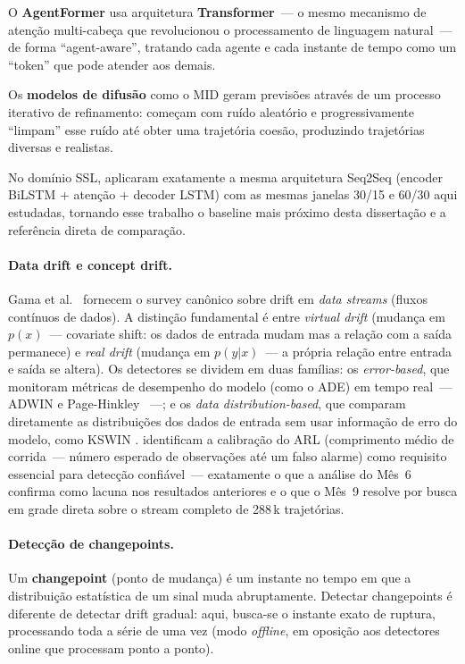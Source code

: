 \documentclass[11pt,a4paper]{article}
\begin{document}
O \textbf{AgentFormer} \cite{yuan2021} usa arquitetura \textbf{Transformer}~--- o mesmo mecanismo de aten\c{c}\~ao multi-cabe\c{c}a que revolucionou o processamento de linguagem natural~--- de forma ``agent-aware'', tratando cada agente e cada instante de tempo como um ``token'' que pode atender aos demais.

Os \textbf{modelos de difus\~ao} como o MID \cite{gu2022} geram previs\~oes atrav\'es de um processo iterativo de refinamento: come\c{c}am com ru\'ido aleat\'orio e progressivamente ``limpam'' esse ru\'ido at\'e obter uma trajet\'oria coes\~ao, produzindo trajet\'orias diversas e realistas.

No dom\'inio SSL, \citet{steuernagel2022} aplicaram exatamente a mesma arquitetura Seq2Seq (encoder BiLSTM + aten\c{c}\~ao + decoder LSTM) com as mesmas janelas 30/15 e 60/30 aqui estudadas, tornando esse trabalho o baseline mais pr\'oximo desta disserta\c{c}\~ao e a refer\^encia direta de compara\c{c}\~ao.

\paragraph{Data drift e concept drift.}
Gama et al.\ \cite{gama2014} fornecem o survey can\^onico sobre drift em \emph{data streams} (fluxos cont\'inuos de dados). A distin\c{c}\~ao fundamental \'e entre \emph{virtual drift} (mudan\c{c}a em $p(x)$~--- covariate shift: os dados de entrada mudam mas a rela\c{c}\~ao com a sa\'ida permanece) e \emph{real drift} (mudan\c{c}a em $p(y|x)$~--- a pr\'opria rela\c{c}\~ao entre entrada e sa\'ida se altera). Os detectores se dividem em duas fam\'ilias: os \emph{error-based}, que monitoram m\'etricas de desempenho do modelo (como o ADE) em tempo real~--- ADWIN \cite{adwin} e Page-Hinkley \cite{page_hinkley}~---; e os \emph{data distribution-based}, que comparam diretamente as distribui\c{c}\~oes dos dados de entrada sem usar informa\c{c}\~ao de erro do modelo, como KSWIN \cite{kswin}. \citet{lu2019} identificam a calibra\c{c}\~ao do ARL (comprimento m\'edio de corrida~--- n\'umero esperado de observa\c{c}\~oes at\'e um falso alarme) como requisito essencial para detec\c{c}\~ao confi\'avel~--- exatamente o que a an\'alise do M\^es~6 confirma como lacuna nos resultados anteriores e o que o M\^es~9 resolve por busca em grade direta sobre o stream completo de 288\,k trajet\'orias.

\paragraph{Detec\c{c}\~ao de changepoints.}
Um \textbf{changepoint} (ponto de mudan\c{c}a) \'e um instante no tempo em que a distribui\c{c}\~ao estat\'istica de um sinal muda abruptamente. Detectar changepoints \'e diferente de detectar drift gradual: aqui, busca-se o instante exato de ruptura, processando toda a s\'erie de uma vez (modo \emph{offline}, em oposi\c{c}\~ao aos detectores online que processam ponto a ponto).
\end{document}
